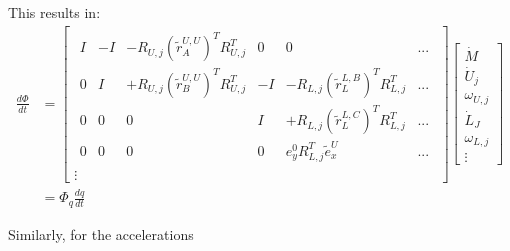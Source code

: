 This results in:
\begin{equation}
\begin{split}
    \frac{d\Phi}{dt}&=
    \begin{bmatrix}
    \begin{array}{cccccc} %
    I & -I & -R_{U,j}({\tilde r}^{U,U}_A)^T R_{U,j}^T & 0 & 0 & ... \\
    0 &  I & +R_{U,j}({\tilde r}^{U,U}_B)^T R_{U,j}^T & -I& -R_{L,j}({\tilde r}^{L,B}_L)^T R_{L,j}^T & ...\\
    0 & 0 & 0 & I & +R_{L,j}({\tilde r}^{L,C}_L)^T R_{L,j}^T & ... \\
    0 & 0 & 0 & 0 & e_{y}^0 R_{L,j}^T \tilde{e}_{x}^{U} & ... 
    \end{array}\\
    \vdots
    \end{bmatrix}
    \begin{bmatrix}
    \dot{M} \\
    \dot{U}_j \\
    \omega_{U,j} \\
    \dot{L}_J \\
    \omega_{L,j} \\
    \vdots
    \end{bmatrix} \label{eq:PhiDot3D}\\
    &=\Phi_q \tfrac{dq}{dt}
\end{split}
\end{equation}


Similarly, for the accelerations

